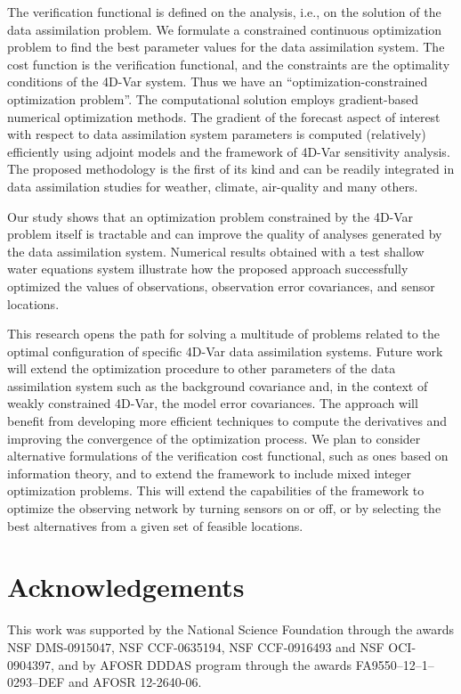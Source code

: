 \documentclass{article}
\begin{document}
The verification functional is defined on the analysis, i.e., on the solution of the data assimilation problem.
We formulate a constrained continuous optimization problem to find the best parameter values
for the data assimilation system. The cost function is the verification functional,
and the constraints are the optimality conditions of the 4D-Var system. Thus we have an
``optimization-constrained optimization problem''.
The computational solution employs gradient-based numerical optimization methods.
The gradient of the forecast aspect of interest with respect to data assimilation system parameters
is computed (relatively) efficiently using adjoint models and the framework of 4D-Var sensitivity analysis. 
The proposed methodology is the first of its kind and can be readily integrated in 
data assimilation studies for weather, climate, air-quality and many others.

Our study shows that an optimization problem constrained by the 4D-Var problem itself is tractable
and can improve the quality of analyses generated by the data assimilation system.
Numerical results obtained with a test shallow water equations system illustrate how
the proposed approach successfully optimized the values 
of observations, observation error covariances, and sensor locations.

This research opens the path for solving a multitude of problems related to the
optimal configuration of specific 4D-Var data assimilation systems. 
Future work will extend the optimization procedure to other parameters of the data assimilation system
such as the background covariance and, in the context of weakly constrained 4D-Var, the model error
covariances. The approach will benefit from developing more efficient techniques
to compute the derivatives and improving the convergence of the optimization process.
We plan to consider alternative formulations of the verification cost functional, such as ones based
on information theory, and to extend the framework to include mixed integer optimization problems.
This will extend the capabilities of the framework to optimize the observing network by turning sensors on or off,
or by selecting the best alternatives from a given set of feasible locations.

\section*{Acknowledgements}


This work was supported by the National Science Foundation through the awards NSF DMS-0915047, NSF CCF-0635194, NSF CCF-0916493 and NSF OCI-0904397,
and by AFOSR DDDAS program through the awards FA9550--12--1--0293--DEF and AFOSR 12-2640-06.



\newpage
\setcounter{page}{1}



\end{document}
